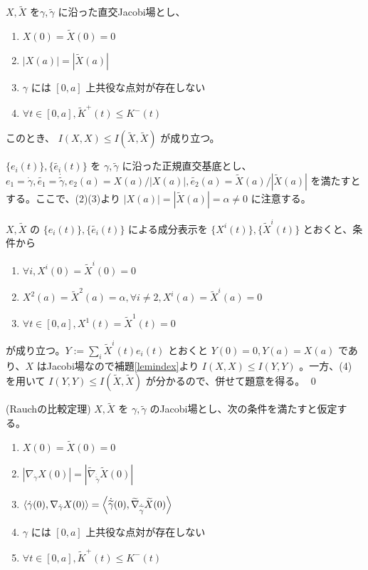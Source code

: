 \documentclass[dvipdfmx,a4paper]{jsreport}
\theoremstyle{definition}
\renewcommand{\tilde}{\widetilde}
\begin{document}
\lem $X,\tilde{X}$ を$\gamma,\tilde{\gamma}$ に沿った直交Jacobi場とし、
\begin{enumerate}
    \item $X(0)=\tilde{X}(0)=0$ 
    \item $|X(a)|=|\tilde{X}(a)|$
    \item $\gamma$ には $[0,a]$ 上共役な点対が存在しない
    \item $\forall t \in [0,a],\tilde{K}^+(t) \leq K^-(t)$ 
\end{enumerate}

このとき、 $I(X,X)\leq I(\tilde{X},\tilde{X})$ が成り立つ。

\prf $\{e_i(t)\},\{\tilde{e_i}(t)\}$ を $\gamma,\tilde{\gamma}$ に沿った正規直交基底とし、$e_1=\dot{\gamma},\tilde{e_1}=\dot{\tilde{\gamma}},e_2(a)=X(a)/|X(a)|,\tilde{e_2}(a)=\tilde{X}(a)/|\tilde{X}(a)|$ を満たすとする。ここで、(2)(3)より $|X(a)|=|\tilde{X}(a)|=\alpha \neq 0$ に注意する。

$X,\tilde{X}$ の $\{e_i(t)\},\{\tilde{e_i}(t)\}$ による成分表示を $\{X^i(t)\},\{\tilde{X}^i(t)\}$ とおくと、条件から
\begin{enumerate}
    \item $\forall i,X^i(0)=\tilde{X}^i(0)=0$
    \item $X^2(a)=\tilde{X}^2(a)=\alpha,\forall i \neq 2,X^i(a)=\tilde{X}^i(a)=0$
    \item $\forall t\in [0,a],X^1(t)=\tilde{X}^1(t)=0$ 
\end{enumerate}

が成り立つ。$Y:=\sum_i \tilde{X}^i(t)e_i(t)$ とおくと $Y(0)=0,Y(a)=X(a)$ であり、$X$ はJacobi場なので補題\ref{lemindex}より $I(X,X) \leq I(Y,Y)$ 。一方、(4) を用いて $I(Y,Y) \leq I(\tilde{X},\tilde{X})$ が分かるので、併せて題意を得る。 \qed 

\thm\label{thmrauch} (Rauchの比較定理) $X,\tilde{X}$ を $\gamma,\tilde{\gamma}$ のJacobi場とし、次の条件を満たすと仮定する。
\begin{enumerate}
    \item $X(0)=\tilde{X}(0)=0$
    \item $|\nabla_{\dot{\gamma}} X(0)|=|\tilde{\nabla}_{\dot{\tilde{\gamma}}} \tilde{X}(0)|$
    \item $\ev{\dot{\gamma}(0),\nabla_{\dot{\gamma}}X(0)}=\ev{\dot{\tilde{\gamma}}(0),\tilde{\nabla}_{\dot{\tilde{\gamma}}} \tilde{X}(0)}$
    \item $\gamma$ には $[0,a]$ 上共役な点対が存在しない
    \item $\forall t \in [0,a],\tilde{K}^+(t) \leq K^-(t)$ 
\end{enumerate}
\end{document}
